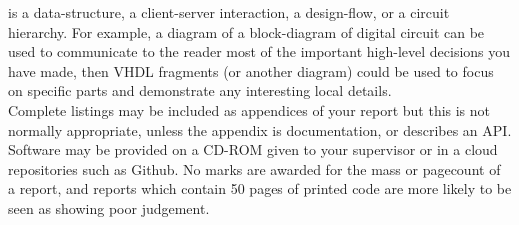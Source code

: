 is a data-structure, a client-server interaction, a
design-flow, or a circuit hierarchy. For example, a
diagram of a block-diagram of digital circuit can be
used to communicate to the reader most of the
important high-level decisions you have made, then
VHDL fragments (or another diagram) could be used
to focus on specific parts and demonstrate any
interesting local details.\\ \newline \noindent Complete listings may be included as appendices of
your report but this is not normally appropriate,
unless the appendix is documentation, or describes an
API. Software may be provided on a CD-ROM given to
your supervisor or in a cloud repositories such as
Github. No marks are awarded for the mass or pagecount of a report, and reports which contain 50 pages
of printed code are more likely to be seen as showing
poor judgement.

